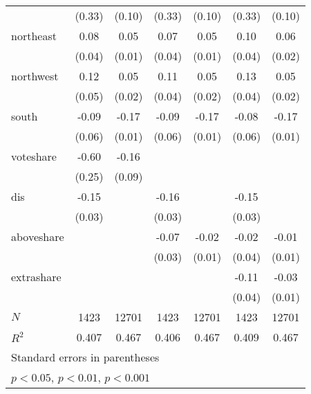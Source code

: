{\begin{tabular}{l*{6}{c}}
          &   (0.33)         &   (0.10)         &   (0.33)         &   (0.10)         &   (0.33)         &   (0.10)         \\
[1em]
northeast &     0.08\sym{*}  &     0.05\sym{***}&     0.07         &     0.05\sym{***}&     0.10\sym{**} &     0.06\sym{***}\\
          &   (0.04)         &   (0.01)         &   (0.04)         &   (0.01)         &   (0.04)         &   (0.02)         \\
[1em]
northwest &     0.12\sym{**} &     0.05\sym{**} &     0.11\sym{*}  &     0.05\sym{**} &     0.13\sym{**} &     0.05\sym{***}\\
          &   (0.05)         &   (0.02)         &   (0.04)         &   (0.02)         &   (0.04)         &   (0.02)         \\
[1em]
south     &    -0.09         &    -0.17\sym{***}&    -0.09         &    -0.17\sym{***}&    -0.08         &    -0.17\sym{***}\\
          &   (0.06)         &   (0.01)         &   (0.06)         &   (0.01)         &   (0.06)         &   (0.01)         \\
[1em]
voteshare &    -0.60\sym{*}  &    -0.16         &                  &                  &                  &                  \\
          &   (0.25)         &   (0.09)         &                  &                  &                  &                  \\
[1em]
dis       &    -0.15\sym{***}&                  &    -0.16\sym{***}&                  &    -0.15\sym{***}&                  \\
          &   (0.03)         &                  &   (0.03)         &                  &   (0.03)         &                  \\
[1em]
aboveshare&                  &                  &    -0.07\sym{*}  &    -0.02\sym{*}  &    -0.02         &    -0.01         \\
          &                  &                  &   (0.03)         &   (0.01)         &   (0.04)         &   (0.01)         \\
[1em]
extrashare&                  &                  &                  &                  &    -0.11\sym{**} &    -0.03\sym{**} \\
          &                  &                  &                  &                  &   (0.04)         &   (0.01)         \\
\hline
\(N\)     &     1423         &    12701         &     1423         &    12701         &     1423         &    12701         \\
\(R^{2}\) &    0.407         &    0.467         &    0.406         &    0.467         &    0.409         &    0.467         \\
\hline\hline
\multicolumn{7}{l}{\footnotesize Standard errors in parentheses}\\
\multicolumn{7}{l}{\footnotesize \sym{*} \(p<0.05\), \sym{**} \(p<0.01\), \sym{***} \(p<0.001\)}\\
\end{tabular}
}
